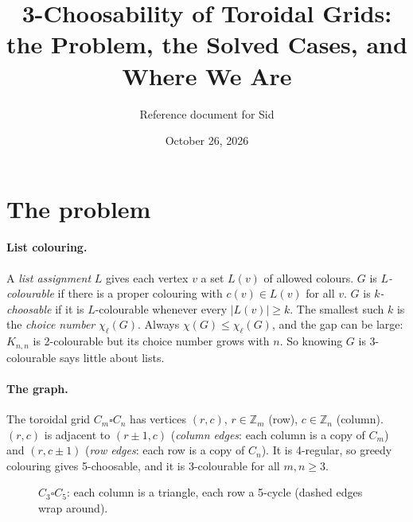 \documentclass[11pt]{article}
\title{3-Choosability of Toroidal Grids:\\ the Problem, the Solved Cases, and Where We Are}
\author{Reference document for Sid}
\date{October 26, 2026}
\theoremstyle{plain}
\theoremstyle{definition}
\newcommand{\T}{\square}
\begin{document}
\maketitle
\tableofcontents
\bigskip

\section{The problem}

\paragraph{List colouring.} A \emph{list assignment} $L$ gives each vertex $v$ a set $L(v)$
of allowed colours. $G$ is \emph{$L$-colourable} if there is a proper colouring with
$c(v)\in L(v)$ for all $v$. $G$ is \emph{$k$-choosable} if it is $L$-colourable whenever
every $|L(v)|\ge k$. The smallest such $k$ is the \emph{choice number} $\chi_\ell(G)$.
Always $\chi(G)\le\chi_\ell(G)$, and the gap can be large: $K_{n,n}$ is 2-colourable but its
choice number grows with $n$. So knowing $G$ is 3-colourable says little about lists.

\paragraph{The graph.} The toroidal grid $C_m\T C_n$ has vertices $(r,c)$, $r\in\mathbb Z_m$
(row), $c\in\mathbb Z_n$ (column). $(r,c)$ is adjacent to $(r\pm1,c)$ (\emph{column edges}:
each column is a copy of $C_m$) and $(r,c\pm1)$ (\emph{row edges}: each row is a copy of
$C_n$). It is 4-regular, so greedy colouring gives 5-choosable, and it is 3-colourable for
all $m,n\ge3$.

\begin{figure}[ht]\centering
{}
\caption{$C_3\T C_5$: each column is a triangle, each row a 5-cycle (dashed edges wrap around).}
\end{figure}
\end{document}
